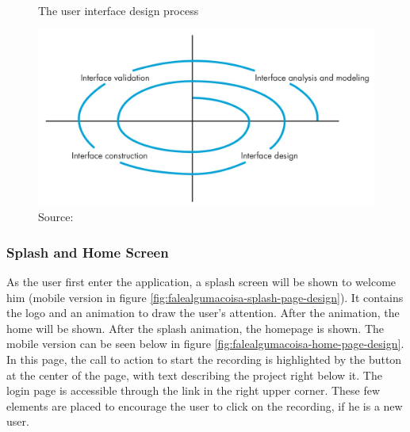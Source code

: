 \begin{figure}[h]
    \centering
    \caption{The user interface design process}
    \label{fig:user-interface-design-process}
    \includegraphics[width=.8\linewidth]{images/sw-req-spec/user-interface-design-process.jpg}
    \caption*{Source: \cite{pressman2014software}}
\end{figure}

\clearpage
\subsubsection{Splash and Home Screen}

As the user first enter the application, a splash screen will be shown to welcome him (mobile version in figure \ref{fig:falealgumacoisa-splash-page-design}). It contains the logo and an animation to draw the user's attention. After the animation, the home will be shown. After the splash animation, the homepage is shown. The mobile version can be seen below in figure \ref{fig:falealgumacoisa-home-page-design}. In this page, the call to action to start the recording is highlighted by the button at the center of the page, with text describing the project right below it. The login page is accessible through the link in the right upper corner. These few elements are placed to encourage the user to click on the recording, if he is a new user.

